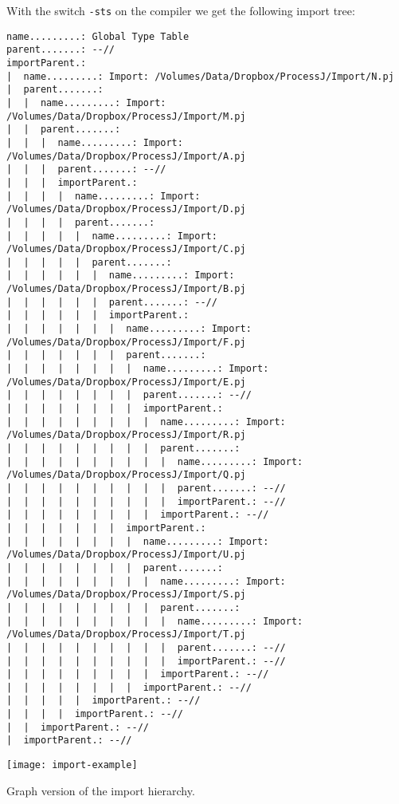 \documentclass[pdflatex,11pt,letter]{article}
\begin{document}
\noindent
With the switch {\tt -sts} on the compiler we get the following import tree:
\newpage
\begin{footnotesize}
\begin{verbatim}
name.........: Global Type Table
parent.......: --//
importParent.: 
|  name.........: Import: /Volumes/Data/Dropbox/ProcessJ/Import/N.pj
|  parent.......: 
|  |  name.........: Import: /Volumes/Data/Dropbox/ProcessJ/Import/M.pj
|  |  parent.......: 
|  |  |  name.........: Import: /Volumes/Data/Dropbox/ProcessJ/Import/A.pj
|  |  |  parent.......: --//
|  |  |  importParent.: 
|  |  |  |  name.........: Import: /Volumes/Data/Dropbox/ProcessJ/Import/D.pj
|  |  |  |  parent.......: 
|  |  |  |  |  name.........: Import: /Volumes/Data/Dropbox/ProcessJ/Import/C.pj
|  |  |  |  |  parent.......: 
|  |  |  |  |  |  name.........: Import: /Volumes/Data/Dropbox/ProcessJ/Import/B.pj
|  |  |  |  |  |  parent.......: --//
|  |  |  |  |  |  importParent.: 
|  |  |  |  |  |  |  name.........: Import: /Volumes/Data/Dropbox/ProcessJ/Import/F.pj
|  |  |  |  |  |  |  parent.......: 
|  |  |  |  |  |  |  |  name.........: Import: /Volumes/Data/Dropbox/ProcessJ/Import/E.pj
|  |  |  |  |  |  |  |  parent.......: --//
|  |  |  |  |  |  |  |  importParent.: 
|  |  |  |  |  |  |  |  |  name.........: Import: /Volumes/Data/Dropbox/ProcessJ/Import/R.pj
|  |  |  |  |  |  |  |  |  parent.......: 
|  |  |  |  |  |  |  |  |  |  name.........: Import: /Volumes/Data/Dropbox/ProcessJ/Import/Q.pj
|  |  |  |  |  |  |  |  |  |  parent.......: --//
|  |  |  |  |  |  |  |  |  |  importParent.: --//
|  |  |  |  |  |  |  |  |  importParent.: --//
|  |  |  |  |  |  |  importParent.: 
|  |  |  |  |  |  |  |  name.........: Import: /Volumes/Data/Dropbox/ProcessJ/Import/U.pj
|  |  |  |  |  |  |  |  parent.......: 
|  |  |  |  |  |  |  |  |  name.........: Import: /Volumes/Data/Dropbox/ProcessJ/Import/S.pj
|  |  |  |  |  |  |  |  |  parent.......: 
|  |  |  |  |  |  |  |  |  |  name.........: Import: /Volumes/Data/Dropbox/ProcessJ/Import/T.pj
|  |  |  |  |  |  |  |  |  |  parent.......: --//
|  |  |  |  |  |  |  |  |  |  importParent.: --//
|  |  |  |  |  |  |  |  |  importParent.: --//
|  |  |  |  |  |  |  |  importParent.: --//
|  |  |  |  |  importParent.: --//
|  |  |  |  importParent.: --//
|  |  importParent.: --//
|  importParent.: --//
\end{verbatim}
\end{footnotesize}

\texttt{[image: import-example]}
\centerline{Graph version of the import hierarchy.}
\end{document}
